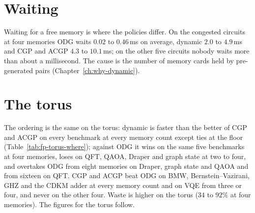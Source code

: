 \section{Waiting}


Waiting for a free memory is where the policies differ. On the congested circuits at four memories ODG waits $0.02$ to $0.46$\,ms on average, dynamic $2.0$ to $4.9$\,ms and CGP and ACGP $4.3$ to $10.1$\,ms; on the other five circuits nobody waits
more than about a millisecond. The cause is the number of memory cards held by pre-generated pairs (Chapter~\ref{ch:why-dynamic}).

\section{The torus}




The ordering is the same on the torus: dynamic is faster than the better of CGP and ACGP on every benchmark at every memory count except ties at the floor (Table~\ref{tab:fp-torus-where}); against ODG it wins on the same five benchmarks at four memories,
loses on QFT, QAOA, Draper and graph state at two to four, and overtakes ODG from eight memories on Draper, graph state and QAOA and from sixteen on QFT. CGP and ACGP beat ODG on BMW, Bernstein--Vazirani, GHZ and the CDKM adder at every
memory count and on VQE from three or four, and never on the other four. Waste is higher on the torus ($34$ to $92\%$ at four memories). The figures for the torus follow.






